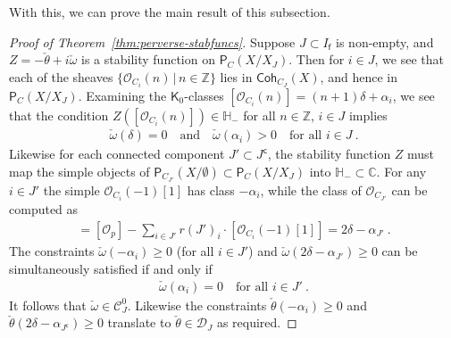 \documentclass[reqno,a4paper]{amsart}
\newcommand{\calC}{\mathcal{C}}
\newcommand{\calD}{\mathcal{D}}
\newcommand{\C}{\mathbb{C}}
\newcommand{\HH}{\mathbb{H}}
\newcommand{\Z}{\mathbb{Z}}
\newcommand{\scrO}{\mathscr{O}}
\newcommand{\sfK}{\mathsf{K}}
\newcommand{\sff}{\mathsf{f}}
\newcommand{\catP}{\mathsf{P}}
\newcommand{\catPC}{\mathsf{P}_{C}}
\newcommand{\catCoh}{\mathsf{Coh}}
\newcommand{\Lomega}{\check{\omega}}
\newcommand{\Ltheta}{\check{\theta}}
\newcommand{\rsv}{X}
\newcommand{\psv}{X_J}
\newcommand{\Jcomp}{{J^\mathsf{c}}}
\theoremstyle{basic-theorem}
\numberwithin{equation}{section}
\begin{document}
With this, we can prove the main result of this subsection.
\begin{proof}[Proof of Theorem~\ref{thm:perverse-stabfuncs}]
    Suppose $J\subset I_\sff$ is non-empty, and $Z=-\Ltheta+i\Lomega$ is a stability function on $\catPC(\rsv/\psv)$. Then for $i\in J$, we see that each of the sheaves $\{\scrO_{C_i}(n)\,\vert\, n\in \Z\}$ lies in $\catCoh_{C_J}(\rsv)$, and hence in $\catPC(\rsv/\psv)$. Examining the $\sfK_0$-classes $[\scrO_{C_i}(n)]=(n+1)\delta+\alpha_i$, we see that the condition $Z([\scrO_{C_i}(n)])\in \HH_-$ for all $n\in \Z$, $i\in J$ implies
	\begin{align}
		\Lomega(\delta)=0\quad\text{and}\quad \Lomega(\alpha_i)>0\quad\text{for all }i\in J\ .
	\end{align}
    Likewise for each connected component $J'\subset \Jcomp$, the stability
    function $Z$ must map the simple objects of
    $\catP_{C_{J'}}(\rsv/\emptyset)\subset \catPC(\rsv/\psv)$ into $\HH_-\subset
    \C$. For any $i\in J'$ the simple $\scrO_{C_i}(-1)[1]$ has class
    $-\alpha_i$, while the class of $\scrO_{C_{J'}}$ can be computed as
    \begin{align}
        [\scrO_{C_{J'}}] = [\scrO_p] - \sum_{i\in J'}r(J')_i\cdot
        [\scrO_{C_i}(-1)[1]] = 2\delta-\alpha_{J'}\ .
    \end{align}
    The constraints $\Lomega(-\alpha_i)\geq 0$ (for all $i\in J'$) and
    $\Lomega(2\delta-\alpha_{J'})\geq 0$ can be simultaneously satisfied if and only if
	\begin{align}
		\Lomega(\alpha_i)=0 \quad \text{for all } i\in J'\ .
	\end{align}
    It follows that $\Lomega\in \calC_J^0$. Likewise the constraints $\Ltheta(-\alpha_i)\geq 0$ and $\Ltheta(2\delta-\alpha_{\Jcomp})\geq 0$ translate to $\Ltheta\in \calD_J$ as required.


\end{proof}
\end{document}
